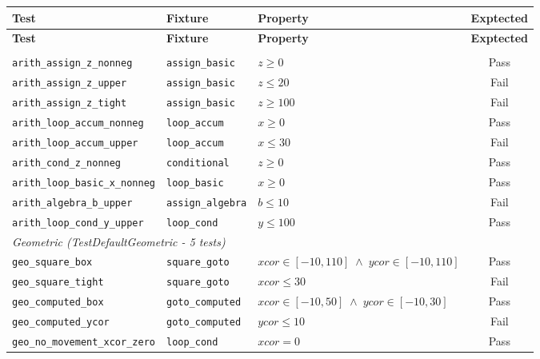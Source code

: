 {\small
\begin{longtable}{p{} p{} p{} c}
\toprule
\textbf{Test} & \textbf{Fixture} & \textbf{Property} & \textbf{Exptected} \\
\midrule
\endfirsthead
\toprule
\textbf{Test} & \textbf{Fixture} & \textbf{Property} & \textbf{Exptected} \\
\midrule
\endhead
\bottomrule
\endfoot
\bottomrule
\endlastfoot

\multicolumn{4}{l}{\textit{Arithmetic (TestDefaultArithmetic - 9 tests)}} \\
\midrule
\texttt{arith\_assign\_z\_nonneg}          & \texttt{assign\_basic}   & $z \geq 0$              & Pass \\
\texttt{arith\_assign\_z\_upper}           & \texttt{assign\_basic}   & $z \leq 20$             & Fail \\
\texttt{arith\_assign\_z\_tight}           & \texttt{assign\_basic}   & $z \geq 100$            & Fail \\
\texttt{arith\_loop\_accum\_nonneg}        & \texttt{loop\_accum}     & $x \geq 0$              & Pass \\
\texttt{arith\_loop\_accum\_upper}         & \texttt{loop\_accum}     & $x \leq 30$             & Fail \\
\texttt{arith\_cond\_z\_nonneg}            & \texttt{conditional}     & $z \geq 0$              & Pass \\
\texttt{arith\_loop\_basic\_x\_nonneg}     & \texttt{loop\_basic}     & $x \geq 0$              & Pass \\
\texttt{arith\_algebra\_b\_upper}          & \texttt{assign\_algebra} & $b \leq 10$             & Fail \\
\texttt{arith\_loop\_cond\_y\_upper}       & \texttt{loop\_cond}      & $y \leq 100$            & Pass \\

\midrule
\multicolumn{4}{l}{\textit{Geometric (TestDefaultGeometric - 5 tests)}} \\
\midrule
\texttt{geo\_square\_box}                  & \texttt{square\_goto}    & $\mathit{xcor}\!\in\![-10,110] \;\wedge\; \mathit{ycor}\!\in\![-10,110]$ & Pass \\
\texttt{geo\_square\_tight}                & \texttt{square\_goto}    & $\mathit{xcor} \leq 30$  & Fail \\
\texttt{geo\_computed\_box}                & \texttt{goto\_computed}  & $\mathit{xcor}\!\in\![-10,50] \;\wedge\; \mathit{ycor}\!\in\![-10,30]$ & Pass \\
\texttt{geo\_computed\_ycor}               & \texttt{goto\_computed}  & $\mathit{ycor} \leq 10$  & Fail \\
\texttt{geo\_no\_movement\_xcor\_zero}     & \texttt{loop\_cond}      & $\mathit{xcor} = 0$      & Pass \\


\end{longtable}}
